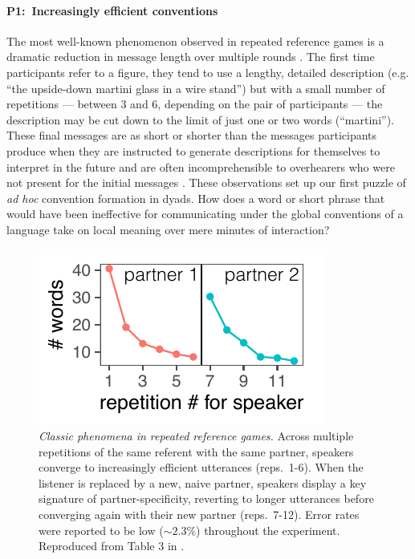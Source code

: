 \paragraph{P1:~Increasingly efficient conventions}
The most well-known phenomenon observed in repeated reference games is a dramatic reduction in message length over multiple rounds \cite{krauss_changes_1964, ClarkWilkesGibbs86_ReferringCollaborative, hawkins2020characterizing}. 
The first time participants refer to a figure, they tend to use a lengthy, detailed description (e.g. ``the upside-down martini glass in a wire stand'') but with a small number of repetitions --- between 3 and 6, depending on the pair of participants --- the description may be cut down to the limit of just one or two words (``martini''). 
These final messages are as short or shorter than the messages participants produce when they are instructed to generate descriptions for themselves to interpret in the future \cite{FussellKrauss89_IntendedAudienceCommonGround} and are often incomprehensible to overhearers who were not present for the initial messages \cite{SchoberClark89_Overhearers}.
These observations set up our first puzzle of \emph{ad hoc} convention formation in dyads.
How does a word or short phrase that would have been ineffective for communicating under the global conventions of a language take on local meaning over mere minutes of interaction? 

\begin{figure}[t!]
\centering
\includegraphics[scale=1.2]{./figures/clark92}
\vspace{1em}
\caption{\textit{Classic phenomena in repeated reference games.} Across multiple repetitions of the same referent with the same partner, speakers converge to increasingly efficient utterances (reps.~1-6). When the listener is  replaced by a new, naive partner, speakers display a key signature of partner-specificity, reverting to longer utterances before converging again with their new partner (reps.~7-12). Error rates were reported to be low ($\sim 2.3\%$) throughout the experiment. Reproduced from Table 3 in \protect{}.}
\label{fig:clark92}
\end{figure}

